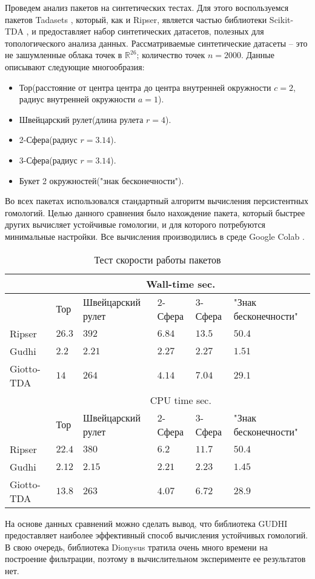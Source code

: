 Проведем анализ пакетов на синтетических тестах. Для этого воспользуемся пакетов Tadasets \cite{Tadasets}, который, как и Ripser, является частью библиотеки Scikit-TDA \cite{scikit}, и предоставляет набор синтетических датасетов, полезных для топологического анализа данных. Рассматриваемые синтетические датасеты -- это не зашумленные облака точек в $\mathbb{R}^{26}$; количество точек $n=2000$. Данные описывают следующие многообразия:
\begin{itemize}
	\item Тор(расстояние от центра центра до центра внутренней окружности $c=2$, радиус внутренней окружности $a=1$).
	\item Швейцарский рулет(длина рулета $r=4$).
	\item 2-Сфера(радиус $r=3.14$).
	\item 3-Сфера(радиус $r=3.14$).
	\item Букет 2 окружностей("знак бесконечности").
\end{itemize}
Во всех пакетах использовался стандартный алгоритм вычисления персистентных гомологий. Целью данного сравнения было нахождение пакета, который быстрее других вычисляет устойчивые гомологии, и для которого потребуются минимальные настройки. Все вычисления производились в среде Google Colab \cite{colab}.
\begin{table}[!htbp]
	\centering
	\small
	\begin{tabularx}{\linewidth}{|X|X|X|X|X|X|}
		\hline
		& \multicolumn{5}{c|}{Wall-time sec.} \\ \hline
		& Тор & Швейцарский рулет & 2-Сфера & 3-Сфера & "Знак бесконечности" \\ \hline
		Ripser & $26.3$ & $392$ & $6.84$ & $13.5$ & $50.4$ \\ \hline
		Gudhi & $2.2$ & $2.21$ & $2.27$ & $2.27$ & $1.51$ \\ \hline
		Giotto-TDA & $14$ & $264$ & $4.14$ & $7.04$ & $29.1$ \\ \hline
		& \multicolumn{5}{c|}{CPU time sec.} \\ \hline
		& Тор & Швейцарский рулет & 2-Сфера & 3-Сфера & "Знак бесконечности" \\ \hline
		Ripser & $22.4$ & $380$ & $6.2$ & $11.7$ & $50.4$ \\ \hline
		Gudhi & $2.12$ & $2.15$ & $2.21$ & $2.23$ & $1.45$ \\ \hline
		Giotto-TDA & $13.8$ & $263$ & $4.07$ & $6.72$ & $28.9$ \\ \hline
	\end{tabularx}
	\caption{Тест скорости работы пакетов}	
	\label{tabl:tests}
\end{table}
На основе данных сравнений можно сделать вывод, что библиотека GUDHI предоставляет наиболее эффективный способ вычисления устойчивых гомологий. В свою очередь, библиотека Dionysus тратила очень много времени на построение фильтрации, поэтому в вычислительном эксперименте ее результатов нет.

